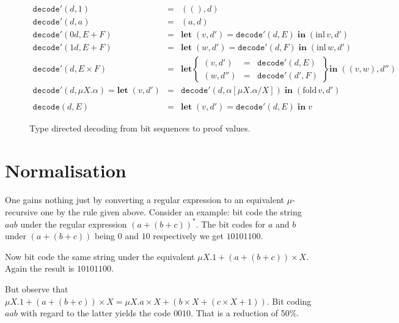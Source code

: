 \documentclass[a4paper, oneside]{memoir}
\theoremstyle{definition}
\begin{document}
\begin{figure}
\[
\begin{array}{lcl}
\mathtt{decode'}(d, 1) & = & ((), d) \\
\mathtt{decode'}(d, a) & = & (a, d) \\
\mathtt{decode'}(0d, E + F) & = & \mathbf{let} \; (v,d') = \mathtt{decode'}(d,E) \; \mathbf{in} \; (\mathrm{inl} \, v, d') \\
\mathtt{decode'}(1d, E + F) & = & \mathbf{let} \; (w,d') = \mathtt{decode'}(d,F) \; \mathbf{in} \; (\mathrm{inl} \, w, d') \\
\mathtt{decode'}(d, E \times F) & = &
    \mathbf{let} \left\{ \begin{array}{rcl} (v,d') &=& \mathtt{decode}'(d, E) \\ (w, d'') &=& \mathtt{decode}'(d', F) \end{array} \right\}
    \mathbf{in} \; ((v,w), d'') \\
\mathtt{decode'}(d, \mu X . \alpha) = \mathbf{let} \; (v,d') & = & \mathtt{decode'}(d, \alpha[\mu X . \alpha / X]) \; \mathbf{in} \; (\mathrm{fold} \, v, d') \\
\\
\mathtt{decode}(d, E) & = & \mathbf{let} \; (v, d') = \mathtt{decode'}(d, E) \; \mathbf{in} \; v
\end{array}
\]
\caption{Type directed decoding from bit sequences to proof values.}
\label{fig:decode}
\end{figure}

\section{Normalisation}
One gains nothing just by converting a regular expression to an equivalent
$\mu$-recursive one by the rule given above. Consider an example: bit code the
string $aab$ under the regular expression $(a + (b + c))^{\ast}$. The bit codes
for $a$ and $b$ under $(a + (b + c))$ being $0$ and $10$ respectively we get
$10101100$.

Now bit code the same string under the equivalent $\mu X. 1 + (a + (b + c))
\times X$. Again the result is $10101100$.

But observe that $\mu X. 1 + (a + (b + c)) \times X = \mu X. a \times X + (b
\times X + (c \times X + 1))$. Bit coding $aab$ with regard to the latter yields
the code $0010$. That is a reduction of 50\%.
\end{document}
